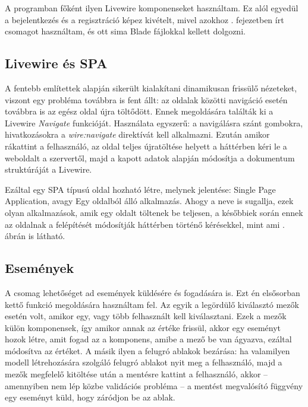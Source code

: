 \documentclass[
]{thesis-ekf}
\theoremstyle{definition}
\theoremstyle{remark}
\begin{document}


A programban főként ilyen Livewire komponenseket használtam. Ez alól egyedül a bejelentkezés és a regisztráció képez kivételt, mivel azokhoz . fejezetben írt csomagot használtam, és ott sima Blade fájlokkal kellett dolgozni.

\subsection{Livewire és SPA}

A fentebb említettek alapján sikerült kialakítani dinamikusan frissülő nézeteket, viszont egy probléma továbbra is fent állt: az oldalak közötti navigáció esetén továbbra is az egész oldal újra töltődött. Ennek megoldására találták ki a Livewire \emph{Navigate}\cite{navigate} funkcióját. Használata egyszerű: a navigálásra szánt gombokra, hivatkozásokra a \emph{wire:navigate} direktívát kell alkalmazni. Ezután amikor rákattint a felhasználó, az oldal teljes újratöltése helyett a háttérben kéri le a weboldalt a szervertől, majd a kapott adatok alapján módosítja a dokumentum struktúráját a Livewire.

Ezáltal egy SPA típusú oldal hozható létre, melynek jelentése: Single Page Application, avagy Egy oldalból álló alkalmazás. Ahogy a neve is sugallja, ezek olyan alkalmazások, amik egy oldalt töltenek be teljesen, a későbbiek során ennek az oldalnak a felépítését módosítják háttérben történő kérésekkel, mint ami . ábrán is látható.\cite{spa}

\subsection{Események}
\label{livewireevents}
A csomag lehetőséget ad események küldésére és fogadására is. Ezt én elsősorban kettő funkció megoldására használtam fel. Az egyik a legördülő kiválasztó mezők esetén volt, amikor egy, vagy több felhasznált kell kiválasztani. Ezek a mezők külön komponensek, így amikor annak az értéke frissül, akkor egy eseményt hozok létre, amit fogad az a komponens, amibe a mező be van ágyazva, ezáltal módosítva az értéket. A másik ilyen a felugró ablakok bezárása: ha valamilyen modell létrehozására szolgáló felugró ablakot nyit meg a felhasználó, majd a mezők megfelelő kitöltése után a mentésre kattint a felhasználó, akkor -- amennyiben nem lép közbe validációs probléma -- a mentést megvalósító függvény egy eseményt küld, hogy záródjon be az ablak.
\end{document}
